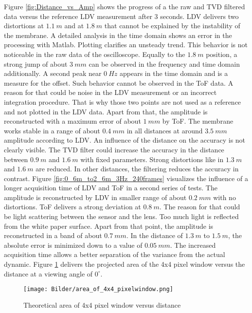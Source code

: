 Figure \ref{fig:Distance_vs_Amp} shows the progress of a the raw and TVD filtered data versus the reference LDV measurement after 3 seconds. LDV delivers two distortions at $1.1~m$ and at $1.8~m$ that cannot be explained by the instability of the membrane. A detailed analysis in the time domain shows an error in the processing with Matlab. Plotting clarifies an unsteady trend. This behavior is not noticeable in the raw data of the oscilloscope. Equally to the $1.8~m$ position, a strong jump of about $3~mm$ can be observed in the frequency and time domain additionally. A second peak near $0~Hz$ appears in the time domain and is a measure for the offset. Such behavior cannot be observed in the ToF data. A reason for that could be noise in the LDV measurement or an incorrect integration procedure. That is why those two points are not used as a reference and not plotted in the LDV data. Apart from that, the amplitude is reconstructed with a maximum error of about $1~mm$ by ToF. The membrane works stable in a range of about $0.4~mm$ in all distances at around $3.5~mm$ amplitude according to LDV. An influence of the distance on the accuracy is not clearly visible. The TVD filter could increase the accuracy in the distance between $0.9~m$ and $1.6~m$ with fixed parameters. Strong distortions like in $1.3~m$ and $1.6~m$ are reduced. In other distances, the filtering reduces the accuracy in contrast. Figure \ref{fig:0_6m_to2_6m_3Hz_240frames} visualizes the influence of a longer acquisition time of LDV and ToF in a second series of tests. The amplitude is reconstructed by LDV in smaller range of about $0.2~mm$ with no distortions. ToF delivers a strong deviation at $0.8~m$. The reason for that could be light scattering between the sensor and the lens. Too much light is reflected from the white paper surface. Apart from that point, the amplitude is reconstructed in a band of about $0.7~mm$. In the distance of $1.3~m$ to $1.5~m$, the absolute error is minimized down to a value of $0.05~mm$. The increased acquisition time allows a better separation of the variance from the actual dynamic. Figure \ref{fig:area_of_4x4_pixelwindow} delivers the projected area of the 4x4 pixel window versus the distance at a viewing angle of $0^\circ$.

 \begin{figure}[!h]  
 	\centering
 	\texttt{[image: Bilder/area\_of\_4x4\_pixelwindow.png]}
 	\caption{Theoretical area of 4x4 pixel window versus distance}
 	\label{fig:area_of_4x4_pixelwindow}
 \end{figure}        

